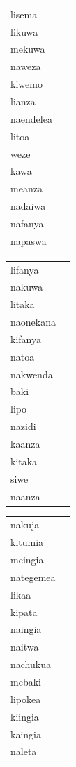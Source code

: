 \documentclass[output=paper,colorlinks,citecolor=brown]{langscibook}
\begin{document}
\begin{table}
\begin{minipage}[t]{.24\textwidth}
\begin{tabular}{ll} 
	\lsptoprule
lisema \\ 
likuwa\\
mekuwa \\ 
naweza \\ 
			kiwemo \\ 
lianza \\ 
naendelea \\ 
litoa \\ 
weze \\ 
kawa \\ 
meanza \\ 
nadaiwa \\ 
nafanya \\ 
napaswa \\ 
\end{tabular}
\end{minipage}
\begin{minipage}[t]{.24\textwidth}
\begin{tabular}{ll} 
lifanya \\ 
nakuwa \\ 
litaka \\ 
naonekana \\ 
kifanya \\ 
natoa \\ 
nakwenda \\ 
baki \\ 
lipo \\ 
nazidi \\ 
kaanza \\ 
kitaka \\ 
siwe \\ 
naanza \\ 

\end{tabular}
\end{minipage}
\begin{minipage}[t]{.24\textwidth}
\begin{tabular}{ll} 

nakuja \\ 
kitumia \\ 
meingia \\ 
nategemea \\ 
likaa \\ 
kipata \\ 
naingia \\ 
naitwa \\ 
nachukua \\ 
mebaki \\ 
lipokea \\ 
kiingia \\ 
kaingia \\ 
naleta \\ 
\end{tabular}
\end{minipage}
\begin{minipage}[t]{.24\textwidth}
\begin{tabular}{ll} 


\end{tabular}
\end{minipage}
\end{table}
\end{document}
